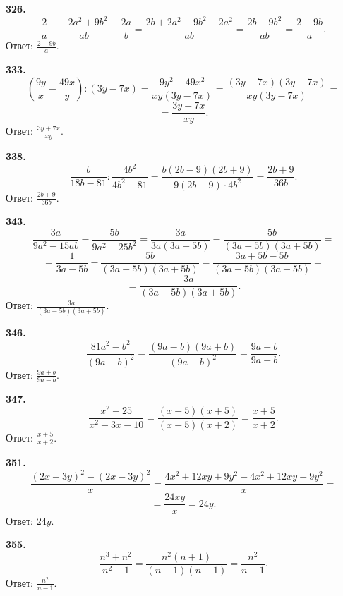 \textbf{326.} $$\frac{2}{a}-\frac{-2a^2+9b^2}{ab}-\frac{2a}{b}=\frac{2b+2a^2-9b^2-2a^2}{ab}=\frac{2b-9b^2}{ab}=\frac{2-9b}{a}.$$ \newline \null \hspace*{\fill} Ответ: $\frac{2-9b}{a}$.

\textbf{333.} $$\left(\frac{9y}{x}-\frac{49x}{y}\right):\left(3y-7x\right)=\frac{9y^2-49x^2}{xy\left(3y-7x\right)}=\frac{\left(3y-7x\right)\left(3y+7x\right)}{xy\left(3y-7x\right)}=$$ $$=\frac{3y+7x}{xy}.$$ \newline \null \hspace*{\fill} Ответ: $\frac{3y+7x}{xy}$.

\newpage \textbf{338.} $$\frac{b}{18b-81}:\frac{4b^2}{4b^2-81}=\frac{b\left(2b-9\right)\left(2b+9\right)}{9\left(2b-9\right)\cdot4b^2}=\frac{2b+9}{36b}.$$ \newline \null \hspace*{\fill} Ответ: $\frac{2b+9}{36b}$.

\textbf{343.} $$\frac{3a}{9a^2-15ab}-\frac{5b}{9a^2-25b^2}=\frac{3a}{3a\left(3a-5b\right)}-\frac{5b}{\left(3a-5b\right)\left(3a+5b\right)}=$$ $$=\frac{1}{3a-5b}-\frac{5b}{\left(3a-5b\right)\left(3a+5b\right)}=\frac{3a+5b-5b}{\left(3a-5b\right)\left(3a+5b\right)}=$$ $$=\frac{3a}{\left(3a-5b\right)\left(3a+5b\right)}.$$ \newline \null \hspace*{\fill} Ответ: $\frac{3a}{\left(3a-5b\right)\left(3a+5b\right)}$.

\textbf{346.} $$\frac{81a^2-b^2}{\left(9a-b\right)^2}=\frac{\left(9a-b\right)\left(9a+b\right)}{\left(9a-b\right)^2}=\frac{9a+b}{9a-b}.$$ \newline \null \hspace*{\fill} Ответ: $\frac{9a+b}{9a-b}$. 

\textbf{347.} $$\frac{x^2-25}{x^2-3x-10}=\frac{\left(x-5\right)\left(x+5\right)}{\left(x-5\right)\left(x+2\right)}=\frac{x+5}{x+2}.$$ \newline \null \hspace*{\fill} Ответ: $\frac{x+5}{x+2}$. 

\textbf{351.} $$\frac{\left(2x+3y\right)^2-\left(2x-3y\right)^2}{x}=\frac{4x^2+12xy+9y^2-4x^2+12xy-9y^2}{x}=$$ $$=\frac{24xy}{x}=24y.$$ \newline \null \hspace*{\fill} Ответ: $24y$. 

\newpage \textbf{355.} $$\frac{n^3+n^2}{n^2-1}=\frac{n^2\left(n+1\right)}{\left(n-1\right)\left(n+1\right)}=\frac{n^2}{n-1}.$$ \newline \null \hspace*{\fill} Ответ: $\frac{n^2}{n-1}$. 


